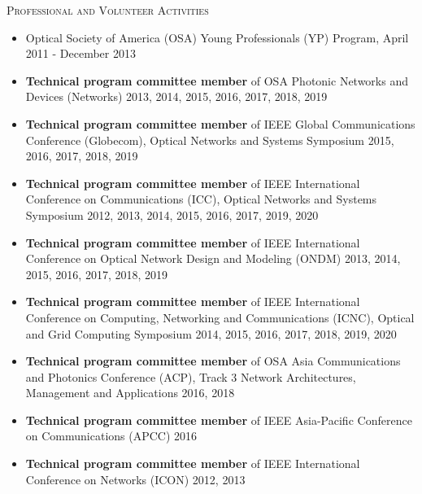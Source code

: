 \documentclass[letterpaper,11pt]{article}
\newcommand{\resheading}[1]{{\noindent\large \colorbox{mygrey}{
\begin{minipage}{1.0\textwidth}{\textsc{#1 \vphantom{p\^{E}}}}\end{minipage}}}}
\begin{document}
\leftskip 0.0cm
\vspace{0.1in}
\resheading{Professional and Volunteer Activities}%
\begin{itemize}
\setlength{\itemindent}{-0.075in}


\item
Optical Society of America (OSA) Young Professionals (YP) Program, April 2011 - December 2013

\item
\textbf{Technical program committee member} of OSA Photonic Networks and Devices (Networks) 2013, 2014, 2015, 2016, 2017, 2018, 2019

\item
\textbf{Technical program committee member} of IEEE Global Communications Conference (Globecom), Optical Networks and Systems Symposium 2015, 2016, 2017,
2018, 2019

\item
\textbf{Technical program committee member} of IEEE International Conference on Communications (ICC), Optical Networks and Systems Symposium
2012, 2013, 2014, 2015, 2016, 2017, 2019, 2020

\item
\textbf{Technical program committee member} of IEEE International Conference on Optical Network Design and Modeling (ONDM)
2013, 2014, 2015, 2016, 2017, 2018, 2019

\item
\textbf{Technical program committee member} of IEEE International Conference on Computing, Networking and Communications (ICNC),
Optical and Grid Computing Symposium 2014, 2015, 2016, 2017, 2018, 2019, 2020

\item
\textbf{Technical program committee member} of OSA Asia Communications and Photonics Conference (ACP),
Track 3 Network Architectures, Management and Applications 2016, 2018

\item
\textbf{Technical program committee member} of IEEE Asia-Pacific Conference on Communications (APCC) 2016

\item
\textbf{Technical program committee member} of IEEE International Conference on Networks (ICON) 2012, 2013


\end{itemize}
\end{document}
